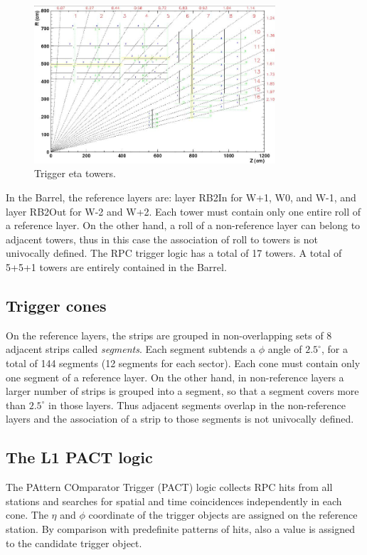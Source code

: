 \begin{figure}[hbtp]
  \begin{center}
    \includegraphics[width=0.8\textwidth]{eta_towers}
    \hspace{1cm}
    \caption{Trigger eta towers.}
    \label{fig:eta_towers}
  \end{center}
\end{figure}

In the Barrel, the reference layers are:
layer RB2In for W+1, W0, and W-1, 
and layer RB2Out for W-2 and W+2. 
Each tower must contain only one entire roll 
of a reference layer. On the 
other hand, a roll of a non-reference layer
can belong to adjacent towers, thus in this case 
the association of roll to towers is not univocally defined. 
The RPC trigger logic has a total of 17 towers.
A total of 5+5+1 towers are entirely contained in the Barrel.

\subsection{Trigger cones}
On the reference layers, the strips are grouped in
non-overlapping sets of 8 adjacent strips called {\em segments}.
Each segment subtends a $\phi$ angle of $2.5^\circ$, for a total 
of 144 segments (12 segments for each sector).
Each cone must contain only one segment of a reference 
layer.
On the other hand, in non-reference layers a larger number
of strips is grouped into a segment, so that a segment
covers more than $2.5^\circ$ in those layers.
Thus adjacent segments overlap in the non-reference layers and 
the association of a strip to those segments is not univocally defined.

\subsection{The L1 PACT logic}
The PAttern COmparator Trigger (PACT) logic 
collects RPC hits from all stations and searches for
spatial and time coincidences independently
in each cone. The $\eta$ and $\phi$ coordinate of the trigger
objects are assigned on the reference station.
By comparison with predefinite patterns of hits, 
also a \pt value is assigned to the candidate trigger 
object. 


